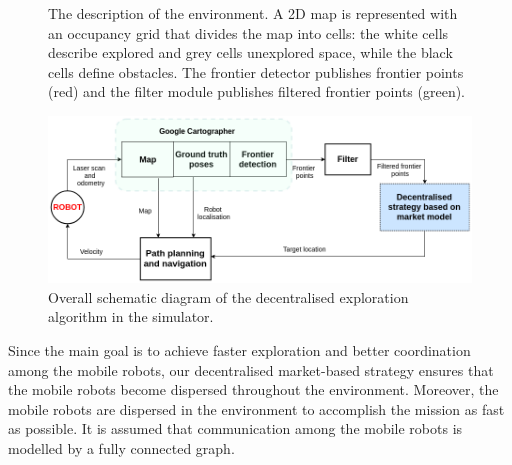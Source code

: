 \documentclass[letterpaper, 10 pt, conference]{ieeeconf}  %
\begin{document}
\begin{figure}{}
    \centering
	\caption {The description of the environment. A 2D map is represented with an occupancy grid that divides the map into cells: the white cells describe explored and grey cells unexplored space, while the black cells define obstacles. The frontier detector publishes frontier points (red) and the filter module publishes filtered frontier points (green).}
	\label{fig:environment}
\end{figure}

\begin{figure}
    \centering\includegraphics[width=1.0\columnwidth]{diagram_exploration2.png}
	\caption{Overall schematic diagram of the decentralised exploration algorithm in the simulator.}
   \label{fig:exploration-strategy}
\end{figure}

Since the main goal is to achieve faster exploration and better coordination among the mobile robots, our decentralised market-based strategy ensures that the mobile robots become dispersed throughout the environment. Moreover, the mobile robots are dispersed in the environment to accomplish the mission as fast as possible. It is assumed that communication among the mobile robots is modelled by a fully connected graph.
\end{document}
